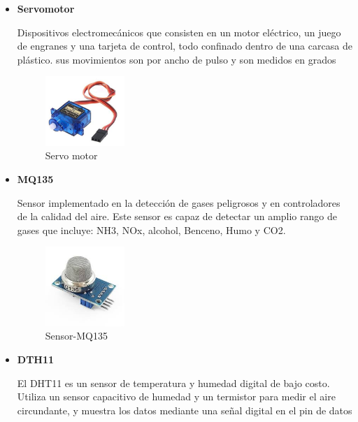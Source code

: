 \documentclass[letterpaper,12pt]{article}
\begin{document}
{\begin{itemize}
\begin{figure}[h]
			\end{figure}

			\item \textbf{Servomotor}
			
			Dispositivos electromecánicos que consisten en un motor eléctrico, un juego de engranes y una tarjeta de control, todo confinado dentro de una carcasa de plástico. sus movimientos son por ancho de pulso y son medidos en grados
			
			\begin{figure}[h]
				\centering
				\begin{minipage}[t]{5cm}
					\includegraphics[width=3cm]{images/servo.jpg}	 %
					\caption{ Servo motor}
				\end{minipage}
				
			\end{figure}
			
			\newpage
			\item \textbf{MQ135}
			
			Sensor implementado en la detección de gases peligrosos y en controladores de la calidad del aire. Este sensor es capaz de detectar un amplio rango de gases que incluye: NH3, NOx, alcohol, Benceno, Humo y CO2.
			
			\begin{figure}[h]
				\centering
				\begin{minipage}[t]{5cm}
					\includegraphics[width=3cm]{images/mq135.jpeg}	 %
					\caption{Sensor-MQ135 }
				\end{minipage}
				
			\end{figure}
			
			\item \textbf{DTH11}
			
			El DHT11 es un sensor de temperatura y humedad digital de bajo costo. Utiliza un sensor capacitivo de humedad y un termistor para medir el aire circundante, y muestra los datos mediante una señal digital en el pin de datos 
			

\end{itemize}}
\end{document}
